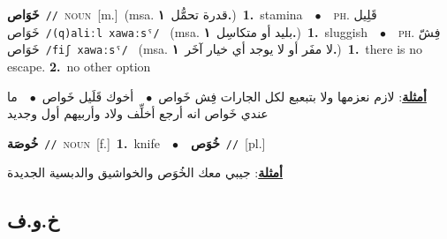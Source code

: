 \documentclass[10pt,a4paper,twoside]{article} %
\begin{document}
\begin{multicols}{2}
{\setlength\topsep{0pt}\textbf{\foreignlanguage{arabic}{خَوَاص}}\ {\color{gray}\texttt{//}\color{black}}\ \textsc{noun}\ [m.]\ \color{gray}(msa. \foreignlanguage{arabic}{قدرة تحمُّل}~\foreignlanguage{arabic}{\textbf{١.}})\color{black}\ \textbf{1.}~stamina\ \ $\bullet$\ \ \textsc{ph.} \color{gray} \foreignlanguage{arabic}{قَلِيل خَوَاص}\color{black}\ {\color{gray}\texttt{/{\sffamily (q)aliːl xawaːsˤ}/}\color{black}}\ \color{gray} (msa. \foreignlanguage{arabic}{بليد أو متكاسِل}~\foreignlanguage{arabic}{\textbf{١.}})\color{black}\ \textbf{1.}~sluggish\ \ $\bullet$\ \ \textsc{ph.} \color{gray} \foreignlanguage{arabic}{فِشّ خَوَاص}\color{black}\ {\color{gray}\texttt{/{\sffamily fiʃ xawaːsˤ}/}\color{black}}\ \color{gray} (msa. \foreignlanguage{arabic}{لا مفَر أو لا يوجد أي خيار آخَر}~\foreignlanguage{arabic}{\textbf{١.}})\color{black}\ \textbf{1.}~there is no escape.  \textbf{2.}~no other option\  \begin{flushright}\color{gray}\foreignlanguage{arabic}{\textbf{\underline{\foreignlanguage{arabic}{أمثلة}}}: لازم نعزمها ولا بتبعبع لكل الجارات فِش خَواص\ $\bullet$\ \  أخوك قَلَيل خَواص\ $\bullet$\ \  ما عندي خَواص انه أرجع أخلِّف ولاد وأربيهم أول وجديد}\end{flushright}\color{black}} \vspace{2mm}

{\setlength\topsep{0pt}\textbf{\foreignlanguage{arabic}{خُوصَة}}\ {\color{gray}\texttt{//}\color{black}}\ \textsc{noun}\ [f.]\ \textbf{1.}~knife\ \ $\bullet$\ \ \setlength\topsep{0pt}\textbf{\foreignlanguage{arabic}{خُوَص}}\ {\color{gray}\texttt{//}\color{black}}\ [pl.]\  \begin{flushright}\color{gray}\foreignlanguage{arabic}{\textbf{\underline{\foreignlanguage{arabic}{أمثلة}}}: جيبي معك الخُوَص والخواشيق والدبسية الجديدة}\end{flushright}\color{black}} \vspace{2mm}

\vspace{-3mm}
\subsection*{\color{blue}\foreignlanguage{arabic}{خ.و.ف}\color{blue}{}} 


\end{multicols}
\end{document}
